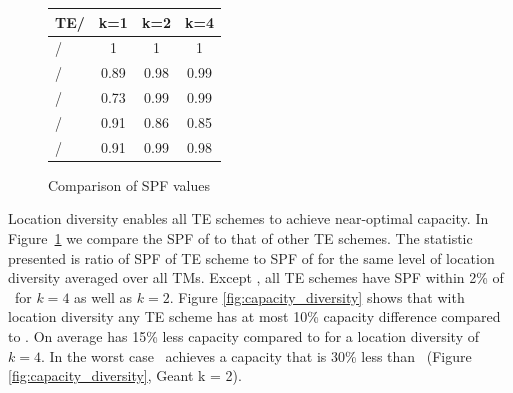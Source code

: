 %





\begin{figure}\footnotesize
\centering
  \begin{tabular}{ l | c | c | c  }
TE/\opt{}&  k=1  & k=2 & k=4 \\ \hline
\opt{}/\opt{} & 1 & 1 & 1 \\ 
\mplsavg{}/ \opt{} & 0.89 & 0.98 & 0.99 \\
\optwt{}/\opt{} & 0.73 & 0.99 & 0.99 \\
\invcap{}/\opt{} & 0.91 & 0.86 & 0.85  \\
\cope{}/\opt{} & 0.91 & 0.99  & 0.98 \\  
  \end{tabular}
  \caption{Comparison of SPF values}
  \label{fig:cap_comparison}
\end{figure}
Location diversity enables all TE schemes to achieve near-optimal capacity. In Figure~\ref{fig:cap_comparison} we compare the SPF of \opt{} to that of other TE schemes. The statistic presented is ratio of SPF of TE scheme to SPF  of \opt{} for the same level of location diversity averaged over all TMs. Except \invcap{}, all TE schemes have SPF within 2\% of \opt\ for $k= 4$ as well as $k = 2$. Figure \ref{fig:capacity_diversity} shows that with location diversity any TE scheme has at most 10\% capacity difference compared to \opt. On average \invcap{} has 15\% less capacity compared to \opt{} for a location diversity of  $k = 4$.  In the worst case \invcap\ achieves a capacity that is 30\% less than \opt\ (Figure \ref{fig:capacity_diversity}, Geant k = 2).

